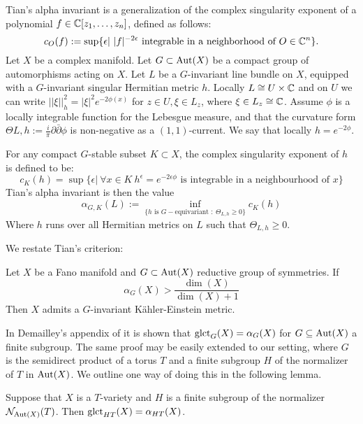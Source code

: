 Tian's alpha invariant is a generalization of the complex singularity exponent of a polynomial \(f \in \mathbb{C}[z_1,\dots,z_n]\), defined as follows:
\[
c_O(f) := \sup \{ \epsilon | \ |f|^{-2 \epsilon} \text{ integrable  in a neighborhood of } O \in \mathbb{C}^n \} .
\]
Let \(X\) be a complex manifold. Let \(G \subset \mathop{\rm Aut}\nolimits( X)\) be a compact group of automorphisms acting on \(X\). Let \(L\) be a \(G\)-invariant line bundle on \(X\), equipped with a \(G\)-invariant singular Hermitian metric \(h\). Locally \(L \cong U \times \mathbb{C}\) and on \(U\) we can write \(||\xi||_h^2 = |\xi|^2 e^{-2 \phi(x)}\) for \(z \in U, \xi \in L_z\), where \(\xi \in L_z \cong \mathbb{C}\). Assume \(\phi\) is a locally integrable function for the Lebesgue measure, and that the curvature form \(\Theta{L,h} := \frac{i}{\pi} \partial \bar{\partial} \phi\) is non-negative as a \((1,1)\)-current. We say that locally \(h = e^{-2 \phi}\).
\begin{definition}
For any compact \(G\)-stable subset \(K \subset X\), the complex singularity exponent of \(h\) is defined to be:
\[
c_K(h) = \sup \{ \epsilon | \ \forall x \in K \ h^\epsilon = e^{-2 \epsilon \phi} \text{ is integrable in a neighbourhood of } x\}
\]
Tian's alpha invariant is then the value
\[
\alpha_{G,K}(L) := \inf_{\{h \text{ is } G-\text{equivariant } : \ \Theta_{L,h} \ge 0\}} c_K(h)
\]
Where \(h\) runs over all Hermitian metrics on \(L\) such that \(\Theta_{L,h} \ge 0\).
\end{definition}
We restate Tian's criterion:
\begin{ttheorem}\label{thm:tcrit}
Let \(X\) be a Fano manifold and \(G \subset \mathop{\rm Aut}\nolimits(X)\) reductive group of symmetries. If
\[
\alpha_{G} (X) > \frac{\dim(X)}{\dim(X) + 1}
\]
Then \(X\) admits a \(G\)-invariant K\"ahler-Einstein metric.
\end{ttheorem}
In Demailley's appendix of \cite{cheltsov08} it is shown that \(\operatorname{glct}_{G}(X) = \alpha_G(X)\) for \(G \subseteq \mathop{\rm Aut}\nolimits(X)\) a finite subgroup. The same proof may be easily extended to our setting, where \(G\) is the semidirect product of a torus \(T\) and a finite subgroup  \(H\) of the normalizer of \(T\) in \(\mathop{\rm Aut}\nolimits(X)\). We outline one way of doing this in the following lemma.
\begin{lemma}
Suppose that \(X\) is a \(T\)-variety and \(H\) is a finite subgroup of the normalizer \( \mathcal{N}_{\mathop{\rm Aut}\nolimits(X)}(T)\). Then \(\operatorname{glct}_{HT}(X) = \alpha_{HT}(X)\).
\end{lemma}
